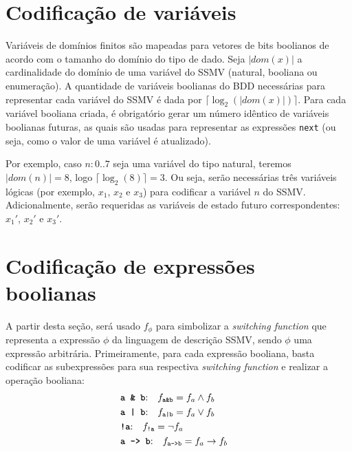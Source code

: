 \documentclass[cic,tc]{infufrgs}
\begin{document}
	\section{Codificação de variáveis}
	\label{sec:cod_var}
	Variáveis de domínios finitos são mapeadas para vetores de bits boolianos de acordo com o tamanho do domínio do tipo de dado. 
	Seja $|dom(x)|$ a cardinalidade do domínio de uma variável do SSMV (natural, booliana ou enumeração). 
	A quantidade de variáveis boolianas do BDD necessárias para representar cada variável do SSMV é dada por $\lceil \log_2(|dom(x)|)\rceil$. Para cada variável booliana criada, é obrigatório gerar um número idêntico de variáveis boolianas futuras, as quais são usadas para representar as expressões \texttt{next} (ou seja, como o valor de uma variável é atualizado).
	
	Por exemplo, caso $n: 0..7$ seja uma variável do tipo natural, teremos $|dom(n)| = 8$, logo $\lceil \log_2(8)\rceil = 3$. Ou seja, serão necessárias três variáveis lógicas (por exemplo, $x_1$, $x_2$ e $x_3$) para codificar a variável $n$ do SSMV. Adicionalmente, serão requeridas as variáveis de estado futuro correspondentes: $x_1'$, $x_2'$ e $x_3'$.
	
	\section{Codificação de expressões boolianas}
	\label{sec:cod_bool}
	A partir desta seção, será usado $f_\phi$ para simbolizar a \textit{switching function} que representa a expressão $\phi$ da linguagem de descrição SSMV, sendo $\phi$ uma expressão arbitrária.
	Primeiramente, para cada expressão booliana, basta codificar as subexpressões para sua respectiva \textit{switching function} e realizar a operação booliana:
	\begin{align}
		&\text{\texttt{\textbf{a \& b}}:}   \quad f_{\texttt{\text{a\&b}}} = f_a \land f_b &\\
		&\text{\texttt{\textbf{a | b}}:}   \quad f_{\texttt{\text{a|b}}} = f_a \lor f_b &\\
		&\text{\texttt{\textbf{!a}}:}      \quad f_{\texttt{\text{!a}}} = \neg f_a &\\
		&\text{\texttt{\textbf{a -> b}}:}  \quad f_{\texttt{\text{a->b}}} = f_a \to f_b &
	\end{align}
	
\end{document}
